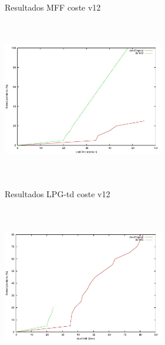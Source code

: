 \documentclass[xcolor=table]{beamer}
\begin{document}
\begin{frame}{Resultados MFF coste v12}
    \begin{center}
    \includegraphics[width=7cm, height=7cm]{mff-or-12-cost}
    \end{center}
\end{frame}


\begin{frame}{Resultados LPG-td coste v12}
    \begin{center}
    \includegraphics[width=7cm, height=7cm]{lpg-or-12-cost}
    \end{center}
\end{frame}

\end{document}
